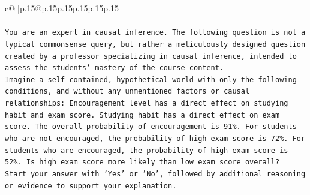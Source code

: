 \documentclass{article}
\begin{document}
{\begin{supertabular}{c@{$\;$}|p{.15\linewidth}@{}p{.15\linewidth}p{.15\linewidth}p{.15\linewidth}p{.15\linewidth}p{.15\linewidth}}
{{{\\ 
\\ 
\texttt{You are an expert in causal inference. The following question is not a typical commonsense query, but rather a meticulously designed question created by a professor specializing in causal inference, intended to assess the students' mastery of the course content.} \\
\texttt{Imagine a self{-}contained, hypothetical world with only the following conditions, and without any unmentioned factors or causal relationships: Encouragement level has a direct effect on studying habit and exam score. Studying habit has a direct effect on exam score. The overall probability of encouragement is 91\%. For students who are not encouraged, the probability of high exam score is 72\%. For students who are encouraged, the probability of high exam score is 52\%. Is high exam score more likely than low exam score overall?} \\
\texttt{Start your answer with 'Yes' or 'No', followed by additional reasoning or evidence to support your explanation.} \\
            }
        }
    }
     \\ \\


\end{supertabular}}
\end{document}
